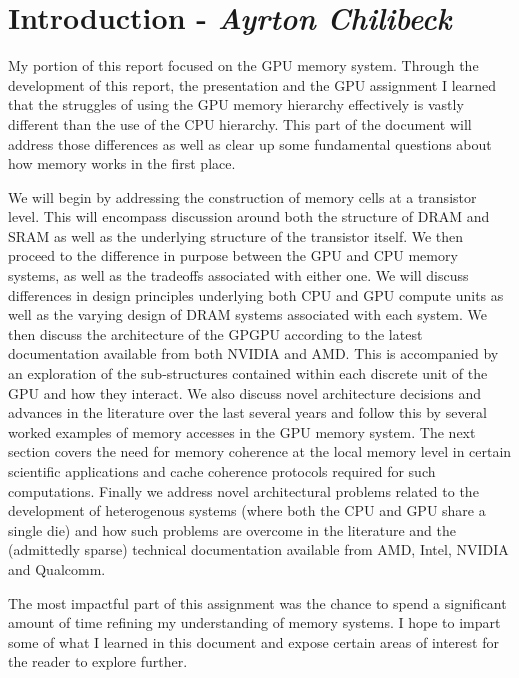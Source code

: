 \chapter{Introduction - \textit{Ayrton Chilibeck}}

My portion of this report focused on the GPU memory system. Through the development of this report, the presentation and the GPU assignment I learned that the struggles of using the GPU memory hierarchy effectively is vastly different than the use of the CPU hierarchy. This part of the document will address those differences as well as clear up some fundamental questions about how memory works in the first place. 

We will begin by addressing the construction of memory cells at a transistor level. This will encompass discussion around both the structure of DRAM and SRAM as well as the underlying structure of the transistor itself. We then proceed to the difference in purpose between the GPU and CPU memory systems, as well as the tradeoffs associated with either one. We will discuss differences in design principles underlying both CPU and GPU compute units as well as the varying design of DRAM systems associated with each system. We then discuss the architecture of the GPGPU according to the latest documentation available from both NVIDIA and AMD. This is accompanied by an exploration of the sub-structures contained within each discrete unit of the GPU and how they interact. We also discuss novel architecture decisions and advances in the literature over the last several years and follow this by several worked examples of memory accesses in the GPU memory system. The next section covers the need for memory coherence at the local memory level in certain scientific applications and cache coherence protocols required for such computations. Finally we address novel architectural problems related to the development of heterogenous systems (where both the CPU and GPU share a single die) and how such problems are overcome in the literature and the (admittedly sparse) technical documentation available from AMD, Intel, NVIDIA and Qualcomm.

The most impactful part of this assignment was the chance to spend a significant amount of time refining my understanding of memory systems. I hope to impart some of what I learned in this document and expose certain areas of interest for the reader to explore further.
